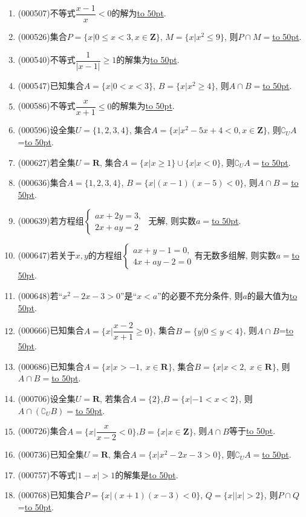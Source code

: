 \documentclass[10pt,a4paper]{article}
\newcommand{\blank}[1]{\underline{\hbox to #1pt{}}}
\begin{document}
\begin{enumerate}[1.]
\item {\tiny (000507)}不等式$\dfrac{x-1}x<0$的解为\blank{50}.
\item {\tiny (000526)}集合$P=\{x|0 \le x<3, x\in \mathbf{Z}\}$, $M=\{x|x^2 \le 9\}$, 则$P\cap M=$\blank{50}.
\item {\tiny (000540)}不等式$\dfrac1{|x-1|}\ge 1 $的解集为\blank{50}.
\item {\tiny (000547)}已知集合$A=\{x|0<x<3\}$, $B=\{x|x^2\ge 4\}$, 则$A\cap B=$\blank{50}.
\item {\tiny (000586)}不等式$\dfrac x{x+1}\le 0$的解集为\blank{50}.
\item {\tiny (000596)}设全集$U=\{1,2,3,4\}$, 集合$A=\{x|x^2-5x+4<0,x\in \mathbf{Z}\}$, 则$\complement_U A$=\blank{50}.
\item {\tiny (000627)}若全集$U=\mathbf{R}$, 集合$A=\{x|x\ge 1\}\cup\{x|x<0\}$, 则$\complement_U A=$\blank{50}.
\item {\tiny (000636)}集合$A=\{1,2,3,4\}$, $B=\{x|(x-1)(x-5)<0\}$, 则$A\cap B=$\blank{50}.
\item {\tiny (000639)}若方程组$\begin{cases} ax+2y=3, \\ 2x+ay=2 \end{cases}$ 无解, 则实数$a=$\blank{50}.
\item {\tiny (000647)}若关于$x,y$的方程组$\begin{cases} ax+y-1=0,  \\ 4x+ay-2=0  \end{cases}$有无数多组解, 则实数$a=$\blank{50}.
\item {\tiny (000648)}若``$x^2-2x-3>0$''是``$x<a$''的必要不充分条件, 则$a$的最大值为\blank{50}.
\item {\tiny (000666)}已知集合$A=\{x|\dfrac{x-2}{x+1}\ge 0\}$, 集合$B=\{y|0 \le y<4\}$, 则$A\cap B$=\blank{50}.
\item {\tiny (000686)}已知集合$A=\{x|x>-1, \ x\in \mathbf{R}\}$, 集合$B=\{x|x<2, \ x\in \mathbf{R}\}$, 则$A\cap B=$\blank{50}.
\item {\tiny (000706)}设全集$U=\mathbf{R}$, 若集合$A=\{2\}$,$B=\{x|-1<x<2\}$, 则$A\cap (\complement_UB)=$\blank{50}.
\item {\tiny (000726)}集合$A=\{x|\dfrac x{x-2}<0\}$,$B=\{x|x\in \mathbf{Z}\}$, 则$A\cap B$等于\blank{50}.
\item {\tiny (000736)}已知全集$U=\mathbf{R}$, 集合$A=\{x|x^2-2x-3>0\}$, 则$\complement_U A=$\blank{50}.
\item {\tiny (000757)}不等式$|1-x|>1$的解集是\blank{50}.
\item {\tiny (000768)}已知集合$P=\{x|(x+1)(x-3)<0\}$, $Q=\{x||x|>2\}$, 则$P\cap Q$=\blank{50}.

\end{enumerate}
\end{document}
